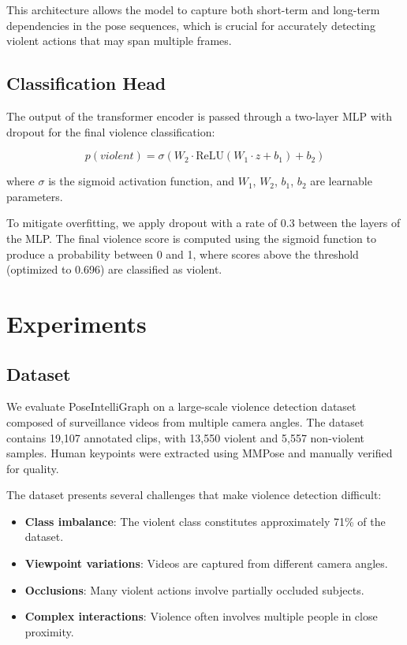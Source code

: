 \documentclass[conference]{IEEEtran}
\begin{document}
This architecture allows the model to capture both short-term and long-term
dependencies in the pose sequences, which is crucial for accurately detecting
violent actions that may span multiple frames.

\subsection{Classification Head}
The output of the transformer encoder is passed through a two-layer MLP with
dropout for the final violence classification:

\begin{equation}
    p(violent) = \sigma(W_2 \cdot \text{ReLU}(W_1 \cdot z + b_1) + b_2)
\end{equation}

where $\sigma$ is the sigmoid activation function, and $W_1$, $W_2$, $b_1$,
$b_2$ are learnable parameters.

To mitigate overfitting, we apply dropout with a rate of 0.3 between the layers
of the MLP. The final violence score is computed using the sigmoid function to
produce a probability between 0 and 1, where scores above the threshold
(optimized to 0.696) are classified as violent.

\section{Experiments}

\subsection{Dataset}
We evaluate PoseIntelliGraph on a large-scale violence detection dataset
composed of surveillance videos from multiple camera angles. The dataset
contains 19,107 annotated clips, with 13,550 violent and 5,557 non-violent
samples. Human keypoints were extracted using MMPose and manually verified for
quality.

The dataset presents several challenges that make violence detection difficult:
\begin{itemize}
    \item \textbf{Class imbalance}: The violent class constitutes approximately 71\% of the dataset.
    \item \textbf{Viewpoint variations}: Videos are captured from different camera angles.
    \item \textbf{Occlusions}: Many violent actions involve partially occluded subjects.
    \item \textbf{Complex interactions}: Violence often involves multiple people in close proximity.
\end{itemize}
\end{document}

